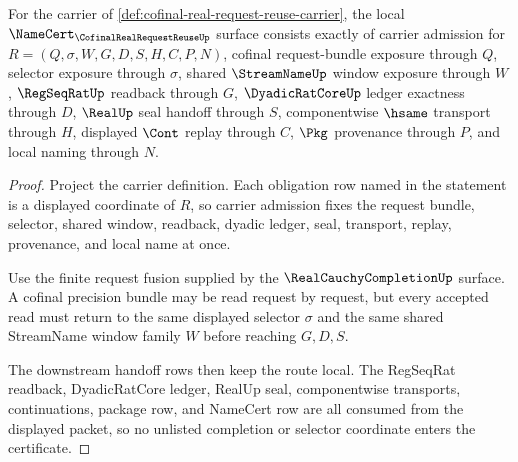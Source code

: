 \begin{theorem}
\label{thm:cofinal-real-request-reuse-namecert-obligations}
For the carrier of \autoref{def:cofinal-real-request-reuse-carrier}, the local $\NameCert_{\CofinalRealRequestReuseUp}$ surface consists exactly of carrier admission for $R=(Q,\sigma,W,G,D,S,H,C,P,N)$, cofinal request-bundle exposure through $Q$, selector exposure through $\sigma$, shared $\StreamNameUp$ window exposure through $W$, $\RegSeqRatUp$ readback through $G$, $\DyadicRatCoreUp$ ledger exactness through $D$, $\RealUp$ seal handoff through $S$, componentwise $\hsame$ transport through $H$, displayed $\Cont$ replay through $C$, $\Pkg$ provenance through $P$, and local naming through $N$.
\end{theorem}
\begin{proof}
Project the carrier definition. Each obligation row named in the statement is a displayed coordinate of $R$, so carrier admission fixes the request bundle, selector, shared window, readback, dyadic ledger, seal, transport, replay, provenance, and local name at once.

Use the finite request fusion supplied by the $\RealCauchyCompletionUp$ surface. A cofinal precision bundle may be read request by request, but every accepted read must return to the same displayed selector $\sigma$ and the same shared StreamName window family $W$ before reaching $G,D,S$.

The downstream handoff rows then keep the route local. The RegSeqRat readback, DyadicRatCore ledger, RealUp seal, componentwise transports, continuations, package row, and NameCert row are all consumed from the displayed packet, so no unlisted completion or selector coordinate enters the certificate.
\end{proof}

